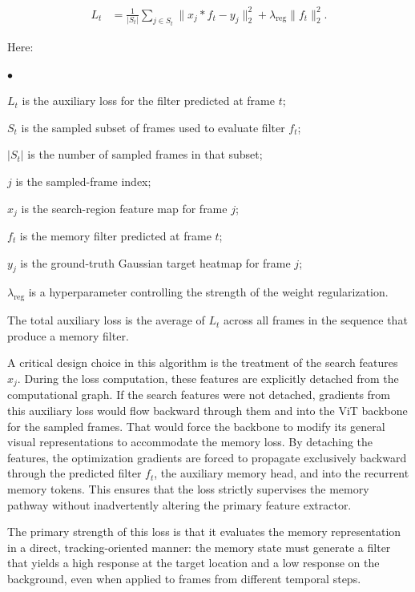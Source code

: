 \documentclass[bachelorthesis]{fer}
\numberwithin{equation}{chapter}
\newcommand{\FormulaNotationWith}[2]{%
    \vspace{-0.6em}
    \noindent\hspace*{1.2em}%
    \begin{minipage}{0.90\textwidth}
        \footnotesize
        #1
        \vspace{0.2em}
        \begin{list}{\(\bullet\)}{
            \setlength{\leftmargin}{1.4em}
            \setlength{\labelwidth}{0.8em}
            \setlength{\labelsep}{0.5em}
            \setlength{\itemsep}{0.05em}
            \setlength{\parsep}{0pt}
            \setlength{\topsep}{0.25em}
            \setlength{\partopsep}{0pt}
        }
            #2
        \end{list}
    \end{minipage}
    \par
    \vspace{0.8em}

}
\begin{document}
    \begin{equation}
        \begin{aligned}
            L_t &= \frac{1}{|{S}_t|}
            \sum_{j \in {S}_t}
            \lVert x_j * f_t - y_j \rVert_2^2
            + \lambda_{\mathrm{reg}} \lVert f_t \rVert_2^2.
        \end{aligned}
    \end{equation}
    \FormulaNotationWith{Here:}{
        \item \(L_t\) is the auxiliary loss for the filter predicted at frame \(t\);
        \item \({S}_t\) is the sampled subset of frames used to evaluate filter \(f_t\);
        \item \(|{S}_t|\) is the number of sampled frames in that subset;
        \item \(j\) is the sampled-frame index;
        \item \(x_j\) is the search-region feature map for frame \(j\);
        \item \(f_t\) is the memory filter predicted at frame \(t\);
        \item \(y_j\) is the ground-truth Gaussian target heatmap for frame \(j\);
        \item \(\lambda_{\mathrm{reg}}\) is a hyperparameter controlling the strength of the weight regularization.
    }
    The total auxiliary loss is the average of \(L_t\) across all frames in the sequence that
    produce a memory filter.

    A critical design choice in this algorithm is the treatment of the search features \(x_j\). During the loss computation,
    these features are explicitly detached from the computational graph. If the search features were not detached, gradients
    from this auxiliary loss would flow backward through them and into the ViT backbone for the sampled frames. That would
    force the backbone to modify its general visual representations to accommodate the memory loss. By detaching the
    features, the optimization gradients are forced to propagate exclusively backward through the predicted filter \(f_t\),
    the auxiliary memory head, and into the recurrent memory tokens. This ensures that the loss strictly supervises the
    memory pathway without inadvertently altering the primary feature extractor.

    The primary strength of this loss is that it evaluates the memory representation in a direct, tracking-oriented manner:
    the memory state must generate a filter that yields a high response at the target location and a low response on the
    background, even when applied to frames from different temporal steps.
\end{document}
